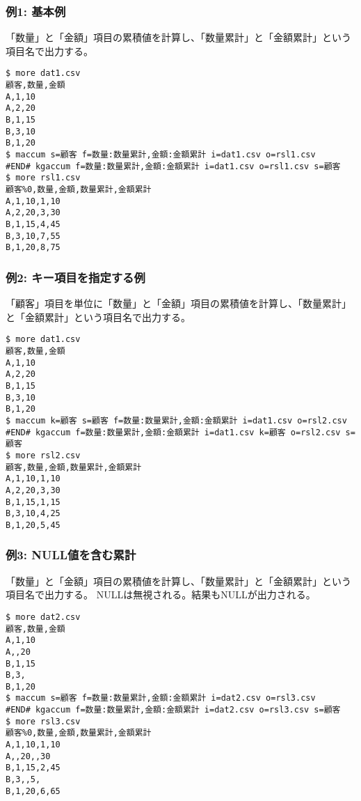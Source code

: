 \subsubsection*{例1: 基本例}

「数量」と「金額」項目の累積値を計算し、「数量累計」と「金額累計」という項目名で出力する。


\begin{Verbatim}[baselinestretch=0.7,frame=single]
$ more dat1.csv
顧客,数量,金額
A,1,10
A,2,20
B,1,15
B,3,10
B,1,20
$ maccum s=顧客 f=数量:数量累計,金額:金額累計 i=dat1.csv o=rsl1.csv
#END# kgaccum f=数量:数量累計,金額:金額累計 i=dat1.csv o=rsl1.csv s=顧客
$ more rsl1.csv
顧客%0,数量,金額,数量累計,金額累計
A,1,10,1,10
A,2,20,3,30
B,1,15,4,45
B,3,10,7,55
B,1,20,8,75
\end{Verbatim}
\subsubsection*{例2: キー項目を指定する例}

「顧客」項目を単位に「数量」と「金額」項目の累積値を計算し、「数量累計」と「金額累計」という項目名で出力する。


\begin{Verbatim}[baselinestretch=0.7,frame=single]
$ more dat1.csv
顧客,数量,金額
A,1,10
A,2,20
B,1,15
B,3,10
B,1,20
$ maccum k=顧客 s=顧客 f=数量:数量累計,金額:金額累計 i=dat1.csv o=rsl2.csv
#END# kgaccum f=数量:数量累計,金額:金額累計 i=dat1.csv k=顧客 o=rsl2.csv s=顧客
$ more rsl2.csv
顧客,数量,金額,数量累計,金額累計
A,1,10,1,10
A,2,20,3,30
B,1,15,1,15
B,3,10,4,25
B,1,20,5,45
\end{Verbatim}
\subsubsection*{例3: NULL値を含む累計}

「数量」と「金額」項目の累積値を計算し、「数量累計」と「金額累計」という項目名で出力する。
NULLは無視される。結果もNULLが出力される。


\begin{Verbatim}[baselinestretch=0.7,frame=single]
$ more dat2.csv
顧客,数量,金額
A,1,10
A,,20
B,1,15
B,3,
B,1,20
$ maccum s=顧客 f=数量:数量累計,金額:金額累計 i=dat2.csv o=rsl3.csv
#END# kgaccum f=数量:数量累計,金額:金額累計 i=dat2.csv o=rsl3.csv s=顧客
$ more rsl3.csv
顧客%0,数量,金額,数量累計,金額累計
A,1,10,1,10
A,,20,,30
B,1,15,2,45
B,3,,5,
B,1,20,6,65
\end{Verbatim}
